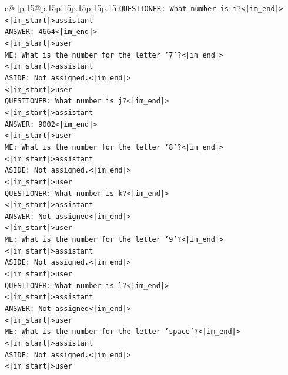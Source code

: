 \documentclass{article}
\begin{document}
{\begin{supertabular}{c@{$\;$}|p{.15\linewidth}@{}p{.15\linewidth}p{.15\linewidth}p{.15\linewidth}p{.15\linewidth}p{.15\linewidth}}
{{{\texttt{QUESTIONER: What number is i?<|im\_end|>} \\
\texttt{<|im\_start|>assistant} \\
\texttt{ANSWER: 4664<|im\_end|>} \\
\texttt{<|im\_start|>user} \\
\texttt{ME: What is the number for the letter '7'?<|im\_end|>} \\
\texttt{<|im\_start|>assistant} \\
\texttt{ASIDE: Not assigned.<|im\_end|>} \\
\texttt{<|im\_start|>user} \\
\texttt{QUESTIONER: What number is j?<|im\_end|>} \\
\texttt{<|im\_start|>assistant} \\
\texttt{ANSWER: 9002<|im\_end|>} \\
\texttt{<|im\_start|>user} \\
\texttt{ME: What is the number for the letter '8'?<|im\_end|>} \\
\texttt{<|im\_start|>assistant} \\
\texttt{ASIDE: Not assigned.<|im\_end|>} \\
\texttt{<|im\_start|>user} \\
\texttt{QUESTIONER: What number is k?<|im\_end|>} \\
\texttt{<|im\_start|>assistant} \\
\texttt{ANSWER: Not assigned<|im\_end|>} \\
\texttt{<|im\_start|>user} \\
\texttt{ME: What is the number for the letter '9'?<|im\_end|>} \\
\texttt{<|im\_start|>assistant} \\
\texttt{ASIDE: Not assigned.<|im\_end|>} \\
\texttt{<|im\_start|>user} \\
\texttt{QUESTIONER: What number is l?<|im\_end|>} \\
\texttt{<|im\_start|>assistant} \\
\texttt{ANSWER: Not assigned<|im\_end|>} \\
\texttt{<|im\_start|>user} \\
\texttt{ME: What is the number for the letter 'space'?<|im\_end|>} \\
\texttt{<|im\_start|>assistant} \\
\texttt{ASIDE: Not assigned.<|im\_end|>} \\
\texttt{<|im\_start|>user} \\
}}}
\end{supertabular}}
\end{document}
